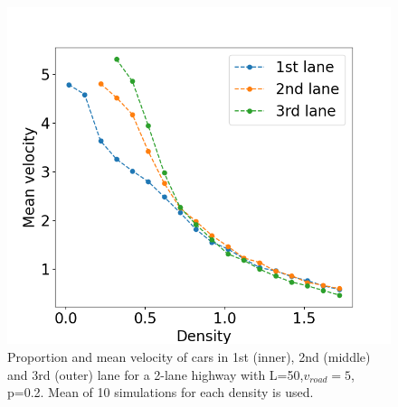 \documentclass[a4paper,12pt]{article}
\begin{document}
\begin{figure}[H]
\begin{minipage}{.5\textwidth}
        \includegraphics[scale=0.37]{fig9.png}
    \end{minipage}
    \caption{Proportion and mean velocity of cars in 1st (inner), 2nd (middle) and 3rd (outer) lane for a 2-lane highway with L=50,$v_{road}=5$, p=0.2. Mean of 10 simulations for each density is used.}
    \label{41a}
\end{figure}
\end{document}
